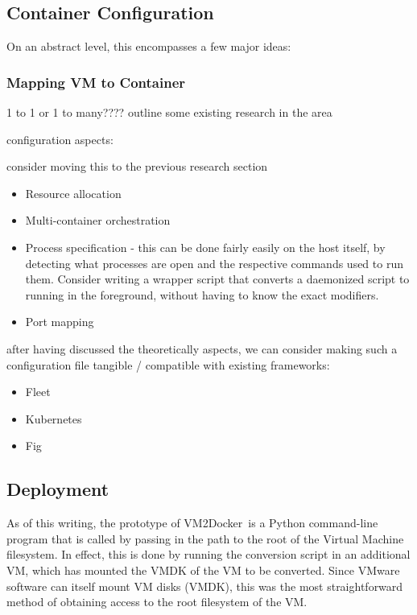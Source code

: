 \documentclass[\myfontsize, letterpaper]{article}
\newcommand{\projectname}{VM2Docker}
\begin{document}
\subsection{Container Configuration}

On an abstract level, this encompasses a few major ideas:

\subsubsection{Mapping VM to Container}
1 to 1 or 1 to many????
outline some existing research in the area

configuration aspects:

consider moving this to the previous research section

\begin{itemize}
\item Resource allocation
\item Multi-container orchestration
\item Process specification - this can be done fairly easily on the host itself, by detecting what processes are open and the respective commands used to run them. Consider writing a wrapper script that converts a daemonized script to running in the foreground, without having to know the exact modifiers.
\item Port mapping
\end{itemize}


after having discussed the theoretically aspects, we can consider making such a configuration file tangible / compatible with existing frameworks:

\begin{itemize}
\item Fleet
\item Kubernetes
\item Fig
\end{itemize}

\subsection{Deployment}
As of this writing, the prototype of \projectname\ is a Python command-line program that is called by passing in the path to the root of the Virtual Machine filesystem. In effect, this is done by running the conversion script in an additional VM, which has mounted the VMDK of the VM to be converted. Since VMware software can itself mount VM disks (VMDK), this was the most straightforward method of obtaining access to the root filesystem of the VM. 
\end{document}
